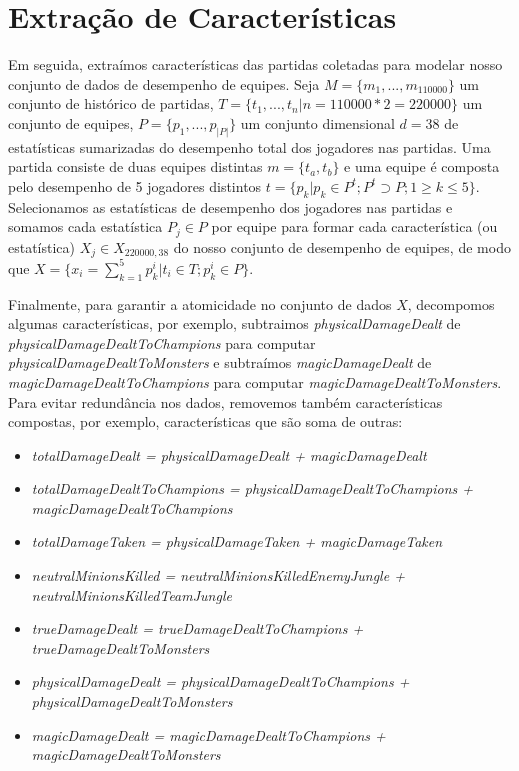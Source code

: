 \section{Extração de Características}


Em seguida, extraímos características das partidas coletadas para modelar nosso conjunto de dados de desempenho de equipes. Seja $M=\{m_1,...,m_{110000}\}$ um conjunto de histórico de partidas, $T=\{t_1, ..., t_n | n=110000 * 2=220000\}$ um conjunto de equipes, $P=\{p_1, ..., p_{|P|}\}$ um conjunto dimensional $d=38$ de estatísticas sumarizadas do desempenho total dos jogadores nas partidas. Uma partida consiste de duas equipes distintas $m=\{t_a,t_b\}$ e uma equipe é composta pelo desempenho de 5 jogadores distintos $t=\{p_k |  p_k \in P^t; P^t \supset P; 1 \geq k \leq 5\}$. Selecionamos as estatísticas de desempenho dos jogadores nas partidas e somamos cada estatística $P_j \in P$ por equipe para formar cada característica (ou estatística) $X_j \in X_{220000, 38}$ do nosso conjunto de desempenho de equipes, de modo que $X = \{ x_{i} = \sum_{k=1}^{5} p_{k}^{i} | t_{i} \in T; p_{k}^{i} \in P \}$.

Finalmente, para garantir a atomicidade no conjunto de dados $X$, decompomos algumas características, por exemplo, subtraimos \textit{physicalDamageDealt} de \textit{physicalDamageDealtToChampions} para computar \textit{physicalDamageDealtToMonsters} e subtraímos \textit{magicDamageDealt} de \textit{magicDamageDealtToChampions} para computar \textit{magicDamageDealtToMonsters}. Para evitar redundância nos dados, removemos também características compostas, por exemplo, características que são soma de outras:

\begin{itemize}
  \item \textit{totalDamageDealt = physicalDamageDealt + magicDamageDealt}
  \item \textit{totalDamageDealtToChampions = physicalDamageDealtToChampions + magicDamageDealtToChampions}
  \item \textit{totalDamageTaken = physicalDamageTaken + magicDamageTaken}
  \item \textit{neutralMinionsKilled = neutralMinionsKilledEnemyJungle + neutralMinionsKilledTeamJungle}
  \item \textit{trueDamageDealt = trueDamageDealtToChampions + trueDamageDealtToMonsters}
  \item \textit{physicalDamageDealt = physicalDamageDealtToChampions + physicalDamageDealtToMonsters}
  \item \textit{magicDamageDealt = magicDamageDealtToChampions + magicDamageDealtToMonsters}
\end{itemize}

